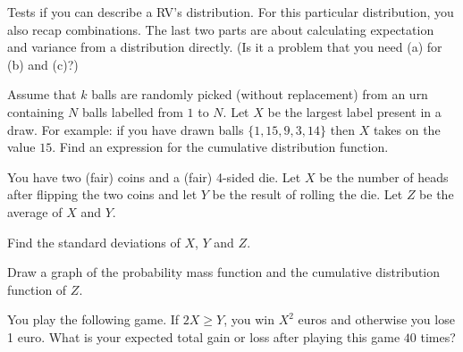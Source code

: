 \documentclass[a4paper,10pt,landscape,twocolumn]{scrartcl}
\begin{document}
\begin{exercise}
\begin{mycomment}
	Tests if you can describe a RV's distribution. For this particular distribution, you also recap combinations. The last two parts are about calculating expectation and variance from a distribution directly. (Is it a problem that you need (a) for (b) and (c)?)
\end{mycomment}

Assume that $k$ balls are randomly picked (without replacement) from an urn containing $N$ balls labelled from $1$ to $N$. Let $X$ be the largest label present in a draw. For example: if you have drawn balls $\{1, 15, 9, 3, 14\}$ then $X$ takes on the value $15$. Find an expression for the cumulative distribution function.
\end{exercise}


\begin{exercise}
You have two (fair) coins and a (fair) 4-sided die. Let $X$ be the number of heads after flipping the two coins and let $Y$ be the result of rolling the die. Let $Z$ be the average of $X$ and $Y$.

	\begin{subex}[1.5pt]
	Find the standard deviations of $X$, $Y$ and $Z$.	
	\end{subex}
	
	\begin{subex}[1pt]
	Draw a graph of the probability mass function and the
        cumulative distribution function of $Z$.
	\end{subex}
	
	\begin{subex}[1.5pt]
	You play the following game. If $2X \ge Y$, you win $X^2$ euros and otherwise you lose 1 euro. What is your expected total gain or loss after playing this game $40$ times?
	\end{subex}
\end{exercise}


%
\end{document}
